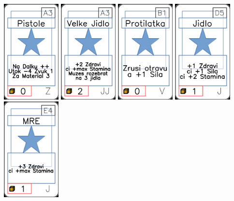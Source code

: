 \documentclass[a4paper]{article}
\begin{document}
	\includegraphics[width=3.0cm]{img-1_92}
	\includegraphics[width=3.0cm]{img-1_32}
	\includegraphics[width=3.0cm]{img-1_65}
	\includegraphics[width=3.0cm]{img-1_19}
	\includegraphics[width=3.0cm]{img-1_23}
\end{document}

